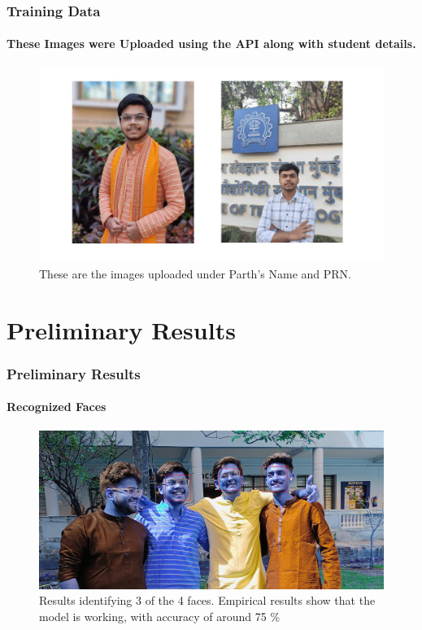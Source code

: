 \documentclass[aspectratio=169]{beamer}
\begin{document}
\begin{frame}
	\centering
	\frametitle{Training Data}
	\framesubtitle{These Images were Uploaded using the API along with student details.}
	\begin{minipage}{0.95\textwidth}
		\begin{figure}[H]
			\centering
			\includegraphics[width=.75\textwidth]{parth.jpg}
			\caption{These are the images uploaded under Parth's Name and PRN.}
		\end{figure}
	\end{minipage}
\end{frame}
\section{Preliminary Results}
\begin{frame}
	\centering
	\frametitle{Preliminary Results}
	\framesubtitle{Recognized Faces}
	\begin{minipage}{0.95\textwidth}
		\begin{figure}[H]
			\centering
			\includegraphics[width=.95\textwidth]{face rec results cropped.jpg}
			\caption{Results identifying 3 of the 4 faces. Empirical results show that the model is working, with accuracy of around 75 \%}
		\end{figure}	\end{minipage}
\end{frame}
\end{document}
